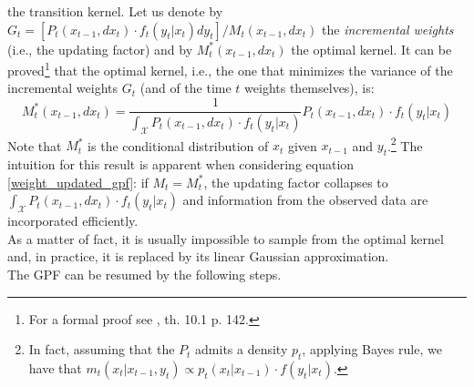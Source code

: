 \documentclass[
]{book}
\theoremstyle{break}
\theoremstyle{nonumberplain}
\begin{document}
the transition kernel. Let us denote by
\(G_t=[P_t(x_{t-1},dx_t)\cdot f_t(y_t|x_t)dy_t]/M_t(x_{t-1},dx_t)\) the
\textit{incremental weights} (i.e., the updating factor) and by
\(M_t^*(x_{t-1},dx_t)\) the optimal kernel. It can be
proved\footnote{For a formal proof see \cite{**}, th. 10.1 p. 142.} that
the optimal kernel, i.e., the one that minimizes the variance of the
incremental weights \(G_t\) (and of the time \(t\) weights themselves),
is: \begin{equation}
    M_t^*(x_{t-1},dx_t)=\frac{1}{\int_{\mathcal X}P_t(x_{t-1},dx_t)\cdot f_t(y_t|x_t)} P_t(x_{t-1},dx_t)\cdot f_t(y_t|x_t)
\end{equation} Note that \(M_t^*\) is the conditional distribution of
\(x_t\) given \(x_{t-1}\) and
\(y_t\).\footnote{In fact, assuming that the $P_t$ admits a density $p_t$, applying Bayes rule, we have that $m_t(x_t|x_{t-1},y_t)\propto p_t(x_t|x_{t-1})\cdot f(y_t|x_t)$.}
The intuition for this result is apparent when considering equation
\eqref{weight_updated_gpf}: if \(M_t=M_t^*\), the updating factor
collapses to \(\int_{\mathcal X}P_t(x_{t-1},dx_t)\cdot f_t(y_t|x_t)\)
and information from the observed data are incorporated efficiently.\\
As a matter of fact, it is usually impossible to sample from the optimal
kernel and, in practice, it is replaced by its linear Gaussian
approximation. ~\\
The GPF can be resumed by the following steps.
\end{document}
